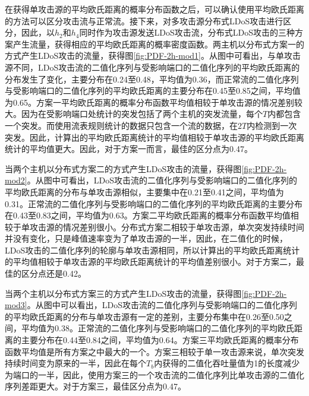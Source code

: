 
在获得单攻击源的平均欧氏距离的概率分布函数之后，可以确认使用平均欧氏距离的方法可以区分攻击流与正常流。接下来，对多攻击源分布式LDoS攻击进行区分，因此，以$h_2$和$h_4$同时作为攻击源发送LDoS攻击流，分布式LDoS攻击的三种方案产生流量，获得相应的平均欧氏距离的概率密度函数。两主机以分布式方案一的方式产生LDoS攻击的流量，获得图\ref{fig:PDF-2h-mod1}。从图中可看出，与单攻击源不同，LDoS攻击流的二值化序列与受影响端口的二值化序列的平均欧氏距离的分布发生了变化，主要分布在0.24至0.48，平均值为0.36，而正常流的二值化序列与受影响端口的二值化序列的平均欧氏距离的主要分布在0.45至0.85之间，平均值为0.65。方案一平均欧氏距离的概率分布函数平均值相较于单攻击源的情况差别较大。因为在受影响端口处统计的突发包括了两个主机的突发流量，每个$T$内都包含一个突发。而使用流表规则统计的数据只包含一个流的数据，在$2T$内检测到一次突发。因此，计算出的平均欧氏距离统计的平均值相较于单攻击源的平均欧氏距离统计的平均值更大。因此，对于方案一而言，最佳的区分点为0.47。

当两个主机以分布式方案二的方式产生LDoS攻击的流量，获得图\ref{fig:PDF-2h-mod2}。从图中可看出，LDoS攻击流的二值化序列与受影响端口的二值化序列的平均欧氏距离的分布与单攻击源相似，主要集中在0.21至0.41之间，平均值为0.31。正常流的二值化序列与受影响端口的二值化序列的平均欧氏距离的主要分布在0.43至0.83之间，平均值为0.63。方案二平均欧氏距离的概率分布函数平均值相较于单攻击源的情况差别很小。分布式方案二相较于单攻击源，单次突发持续时间并没有变化，只是峰值速率变为了单攻击源的一半，因此，在二值化的时候，LDoS攻击的二值化序列的轮廓与单攻击源相同，所以计算出的平均欧氏距离统计的平均值相较于单攻击源的平均欧氏距离统计的平均值差别很小。对于方案二，最佳的区分点还是0.42。

当两个主机以分布式方案三的方式产生LDoS攻击的流量，获得图\ref{fig:PDF-2h-mod3}。从图中可以看出，LDoS攻击流的二值化序列与受影响端口的二值化序列的平均欧氏距离的分布与单攻击源有一定的差别，主要分布集中在0.26至0.50之间，平均值为0.38。正常流的二值化序列与受影响端口的二值化序列的平均欧氏距离的主要分布在0.44至0.84之间，平均值为0.64。方案三平均欧氏距离的概率分布函数平均值是所有方案之中最大的一个。方案三相较于单一攻击源来说，单次突发持续时间变为原来的一半，因此在每个$T_b$内获得的二值化吞吐量值为1的长度减少为端口的一半，因此，使用方案三的一个攻击流的二值化序列比单攻击源的二值化序列差距更大。对于方案三，最佳区分点为0.47。

